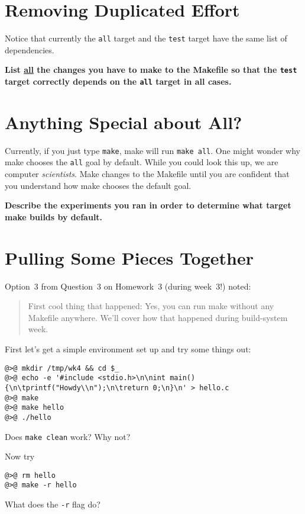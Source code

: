 \documentclass{article}
\begin{document}
\section{Removing Duplicated Effort}

Notice that currently the \texttt{all} target and the \texttt{test} target
have the same list of dependencies.

\textbf{List \ul{all} the changes you have to make to the Makefile so that the
  \texttt{test} target correctly depends on the \texttt{all} target in all
  cases.}
\vspace{2cm}

\section{Anything Special about All?}
\label{q:all}

Currently, if you just type \texttt{make}, make will run \texttt{make all}.
One might wonder why make chooses the \texttt{all} goal by default.
While you could look this up, we are computer \emph{scientists}.
Make changes to the Makefile until you are confident that you understand how
make chooses the default goal.

\textbf{Describe the experiments you ran in order to determine what target
  make builds by default.}
\vspace{3cm}

\newpage

\section{Pulling Some Pieces Together}

Option~3 from Question~3 on Homework~3 (during week~3!) noted:
\begin{quote}
  First cool thing that happened: Yes, you can run make without any Makefile
  anywhere. We'll cover how that happened during build-system week.
\end{quote}
First let's get a simple environment set up and try some things out:
\begin{lstlisting}
@>@ mkdir /tmp/wk4 && cd $_
@>@ echo -e '#include <stdio.h>\n\nint main() {\n\tprintf("Howdy\\n");\n\treturn 0;\n}\n' > hello.c
@>@ make
@>@ make hello
@>@ ./hello
\end{lstlisting}
Does \texttt{make clean} work? Why not?

Now try
\begin{lstlisting}
@>@ rm hello
@>@ make -r hello
\end{lstlisting}
What does the \texttt{-r} flag do?
\end{document}
